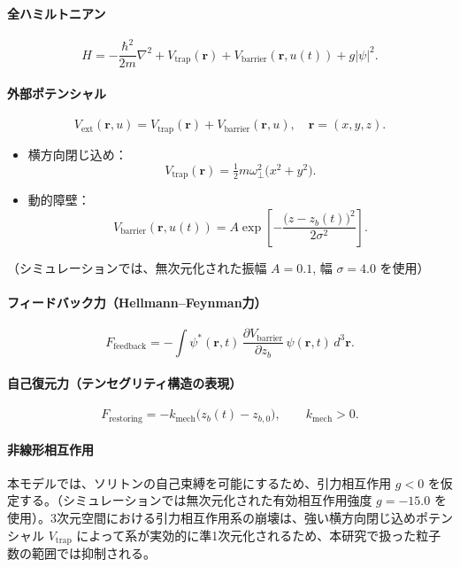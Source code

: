 \documentclass[a4paper,11pt,ja=standard]{bxjsarticle}
\begin{document}
\paragraph{全ハミルトニアン}
\[
H=-\frac{\hbar^{2}}{2m}\nabla^{2}+V_{\text{trap}}(\mathbf r)+V_{\text{barrier}}(\mathbf r,u(t))+g|\psi|^{2}.
\]
\paragraph{外部ポテンシャル}
\[
V_{\text{ext}}(\mathbf r,u)=V_{\text{trap}}(\mathbf r)+V_{\text{barrier}}(\mathbf r,u),\quad\mathbf r=(x,y,z).
\]
\begin{itemize}
\item 横方向閉じ込め：
      \[
         V_{\text{trap}}(\mathbf r)=
         \tfrac{1}{2} m\omega_{\perp}^{2}\bigl(x^{2}+y^{2}\bigr).
      \]
\item 動的障壁：
      \[
         V_{\text{barrier}}(\mathbf r,u(t))
           = A \exp\!\left[
               -\frac{\bigl(z-z_b(t)\bigr)^{2}}{2\sigma^{2}}
             \right].
      \]
\end{itemize}
\noindent
（シミュレーションでは、無次元化された振幅 $A=0.1$, 幅 $\sigma=4.0$ を使用）

\paragraph{フィードバック力（Hellmann–Feynman力）}
\[
F_{\text{feedback}}=-\!\int\psi^{*}(\mathbf r,t)\,
      \frac{\partial V_{\text{barrier}}}{\partial z_b}\,
      \psi(\mathbf r,t)\,d^{3}\mathbf r.
\]

\paragraph{自己復元力（テンセグリティ構造の表現）}
\[
 F_{\text{restoring}}=-k_{\text{mech}}\bigl(z_b(t)-z_{b,0}\bigr),\qquad
 k_{\text{mech}}>0.
\]

\paragraph{非線形相互作用}
本モデルでは、ソリトンの自己束縛を可能にするため、引力相互作用 $g<0$ を仮定する。（シミュレーションでは無次元化された有効相互作用強度 $g = -15.0$ を使用）。3次元空間における引力相互作用系の崩壊は、強い横方向閉じ込めポテンシャル $V_{\text{trap}}$ によって系が実効的に準1次元化されるため、本研究で扱った粒子数の範囲では抑制される。
\end{document}
